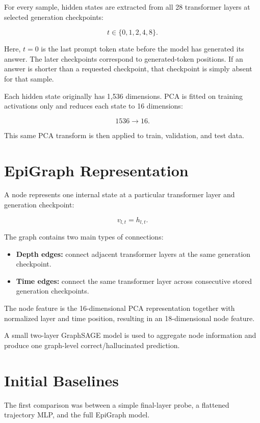 \documentclass[11pt]{article}
\begin{document}
For every sample, hidden states are extracted from all 28 transformer layers at selected generation checkpoints:

\[
t \in \{0,1,2,4,8\}.
\]

Here, \(t=0\) is the last prompt token state before the model has generated its answer. The later checkpoints correspond to generated-token positions. If an answer is shorter than a requested checkpoint, that checkpoint is simply absent for that sample.

Each hidden state originally has 1,536 dimensions. PCA is fitted on training activations only and reduces each state to 16 dimensions:

\[
1536 \rightarrow 16.
\]

This same PCA transform is then applied to train, validation, and test data.

\section{EpiGraph Representation}

A node represents one internal state at a particular transformer layer and generation checkpoint:

\[
v_{l,t} = h_{l,t}.
\]

The graph contains two main types of connections:

\begin{itemize}[leftmargin=1.5em]
    \item \textbf{Depth edges:} connect adjacent transformer layers at the same generation checkpoint.
    \item \textbf{Time edges:} connect the same transformer layer across consecutive stored generation checkpoints.
\end{itemize}

The node feature is the 16-dimensional PCA representation together with normalized layer and time position, resulting in an 18-dimensional node feature.

A small two-layer GraphSAGE model is used to aggregate node information and produce one graph-level correct/hallucinated prediction.

\section{Initial Baselines}

The first comparison was between a simple final-layer probe, a flattened trajectory MLP, and the full EpiGraph model.
\end{document}
